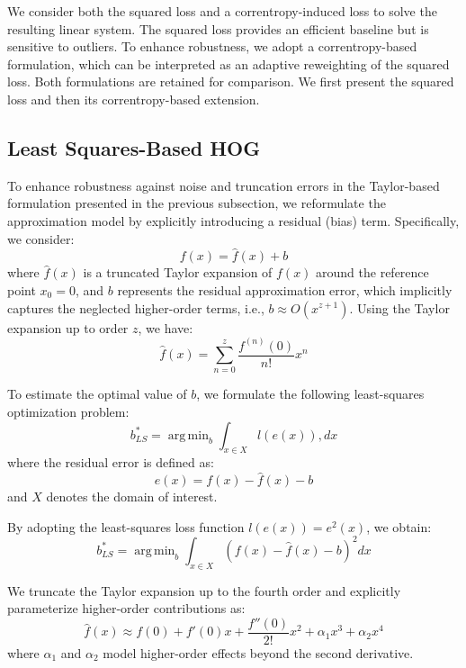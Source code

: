 \documentclass{elsarticle}
\DeclareMathOperator*{\argmin}{arg\,min}
\begin{document}
We consider both the squared loss and a correntropy-induced loss to solve the resulting linear system. The squared loss provides an efficient baseline but is sensitive to outliers. To enhance robustness, we adopt a correntropy-based formulation, which can be interpreted as an adaptive reweighting of the squared loss. Both formulations are retained for comparison. We first present the squared loss and then its correntropy-based extension.

\subsection{Least Squares-Based HOG}

To enhance robustness against noise and truncation errors in the Taylor-based formulation presented in the previous subsection, we reformulate the approximation model by explicitly introducing a residual (bias) term. Specifically, we consider:
\begin{equation}\label{QSM}
	f(x) = \hat{f}(x) + b
\end{equation}
where $\hat{f}(x)$ is a truncated Taylor expansion of $f(x)$ around the reference point $x_0 = 0$, and $b$ represents the residual approximation error, which implicitly captures the neglected higher-order terms, i.e., $b \approx O(x^{z+1})$. Using the Taylor expansion up to order $z$, we have:
\begin{equation}
	\hat{f}(x)=\sum_{n=0}^{z}\frac{f^{(n)}(0)}{n!}x^n
\end{equation}

To estimate the optimal value of $b$, we formulate the following least-squares optimization problem:
\begin{equation}\label{Q14_1}
	b^*_{LS}=\argmin_{b}\int_{x\in X} l(e(x)),dx
\end{equation}
where the residual error is defined as:
\begin{equation}
	e(x)=f(x)-\hat{f}(x)-b
\end{equation}
and $X$ denotes the domain of interest.

By adopting the least-squares loss function $l(e(x)) = e^2(x)$, we obtain:
\begin{equation}\label{Q15_1}
	b^*_{LS}=\argmin_{b}\int_{x\in X}\left(f(x)-\hat{f}(x)-b\right)^2 dx
\end{equation}

We truncate the Taylor expansion up to the fourth order and explicitly parameterize higher-order contributions as:
\begin{equation}\label{Q16_1}
	\hat{f}(x)\approx f(0)+f'(0)x+\frac{f''(0)}{2!}x^2+\alpha_1 x^3+\alpha_2 x^4
\end{equation}
where $\alpha_1$ and $\alpha_2$ model higher-order effects beyond the second derivative.
\end{document}
